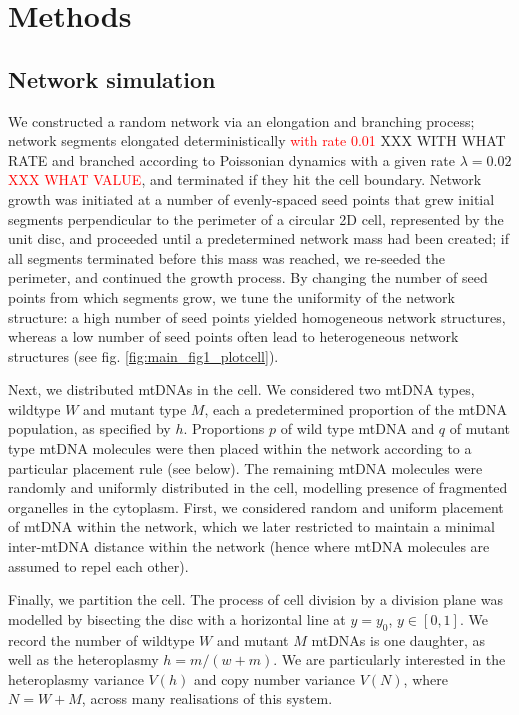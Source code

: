 \documentclass{article}
\begin{document}
\section{Methods}
\subsection*{Network simulation}

We constructed a random network via an elongation and branching process; network segments elongated deterministically \textcolor{red}{with rate 0.01} XXX WITH WHAT RATE and branched according to Poissonian dynamics with a given rate $\lambda=0.02$ \textcolor{red}{XXX WHAT VALUE}, and terminated if they hit the cell boundary. Network growth was initiated at a number of evenly-spaced seed points that grew initial segments perpendicular to the perimeter of a circular 2D cell, represented by the unit disc, and proceeded until a predetermined network mass had been created; if all segments terminated before this mass was reached, we re-seeded the perimeter, and continued the growth process. By changing the number of seed points from which segments grow, we tune the uniformity of the network structure: a high number of seed points yielded homogeneous network structures, whereas a low number of seed points often lead to heterogeneous network structures (see fig. \ref{fig:main_fig1_plotcell}).

Next, we distributed mtDNAs in the cell. We considered two mtDNA types, wildtype $W$ and mutant type $M$, each a predetermined proportion of the mtDNA population, as specified by $h$. Proportions $p$ of wild type mtDNA and $q$ of mutant type mtDNA molecules were then placed within the network according to a particular placement rule (see below). The remaining mtDNA molecules were randomly and uniformly distributed in the cell, modelling presence of fragmented organelles in the cytoplasm. First, we considered random and uniform placement of mtDNA within the network, which we later restricted to maintain a minimal inter-mtDNA distance within the network (hence where mtDNA molecules are assumed to repel each other).

Finally, we partition the cell. The process of cell division by a division plane was modelled by bisecting the disc with a horizontal line at $y=y_0$, $y\in[0,1]$. We record the number of wildtype $W$ and mutant $M$ mtDNAs is one daughter, as well as the heteroplasmy $h = m/(w+m)$. We are particularly interested in the heteroplasmy variance $V(h)$ and copy number variance $V(N)$, where $N=W+M$, across many realisations of this system.  
\end{document}
